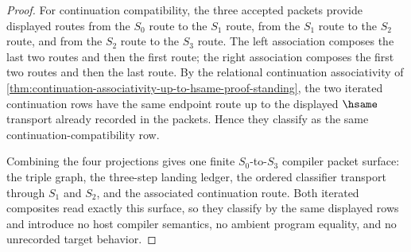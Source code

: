 \begin{proof}
For continuation compatibility, the three accepted packets provide displayed
routes from the $S_0$ route to the $S_1$ route, from the $S_1$ route to the
$S_2$ route, and from the $S_2$ route to the $S_3$ route. The left association
composes the last two routes and then the first route; the right association
composes the first two routes and then the last route. By the relational
continuation associativity of
\autoref{thm:continuation-associativity-up-to-hsame-proof-standing}, the two
iterated continuation rows have the same endpoint route up to the displayed
$\hsame$ transport already recorded in the packets. Hence they classify as the
same continuation-compatibility row.

Combining the four projections gives one finite $S_0$-to-$S_3$ compiler
packet surface: the triple graph, the three-step landing ledger, the ordered
classifier transport through $S_1$ and $S_2$, and the associated continuation
route. Both iterated composites read exactly this surface, so they classify by
the same displayed rows and introduce no host compiler semantics, no ambient
program equality, and no unrecorded target behavior.
\end{proof}

